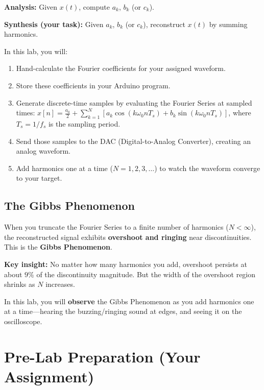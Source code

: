 \documentclass[11pt,letterpaper]{article}
\newcommand{\visualplaceholder}[1]{%
\begin{figure}[H]
    \centering
    \fbox{%
    \begin{minipage}{0.92\textwidth}
        \centering
        \vspace{0.6in}
        \textcolor{red}{\Large\textbf{[#1]}}\\
        \vspace{0.6in}
    \end{minipage}
    }
\end{figure}}
\begin{document}
\textbf{Analysis:} Given $x(t)$, compute $a_k$, $b_k$ (or $c_k$).

\noindent
\textbf{Synthesis (your task):} Given $a_k$, $b_k$ (or $c_k$), reconstruct $x(t)$ by summing harmonics.

In this lab, you will:
\begin{enumerate}
    \item Hand-calculate the Fourier coefficients for your assigned waveform.
    \item Store these coefficients in your Arduino program.
    \item Generate discrete-time samples by evaluating the Fourier Series at sampled times: $x[n] = \frac{a_0}{2} + \sum_{k=1}^{N} \left[ a_k \cos(k\omega_0 n T_s) + b_k \sin(k\omega_0 n T_s) \right]$, where $T_s = 1/f_s$ is the sampling period.
    \item Send those samples to the DAC (Digital-to-Analog Converter), creating an analog waveform.
    \item Add harmonics one at a time ($N = 1, 2, 3, \ldots$) to watch the waveform converge to your target.
\end{enumerate}

\subsection{The Gibbs Phenomenon}

When you truncate the Fourier Series to a finite number of harmonics ($N < \infty$), the reconstructed signal exhibits \textbf{overshoot and ringing} near discontinuities. This is the \textbf{Gibbs Phenomenon}.

\textbf{Key insight:} No matter how many harmonics you add, overshoot persists at about $9\%$ of the discontinuity magnitude. But the width of the overshoot region shrinks as $N$ increases.

In this lab, you will \textbf{observe} the Gibbs Phenomenon as you add harmonics one at a time—hearing the buzzing/ringing sound at edges, and seeing it on the oscilloscope.

\visualplaceholder{INSERT DIAGRAM: Gibbs Phenomenon illustration (square wave approximation with N=1, 3, 5, 9 harmonics, showing convergence and overshoot)}

\clearpage

\section{Pre-Lab Preparation (Your Assignment)}
\end{document}
